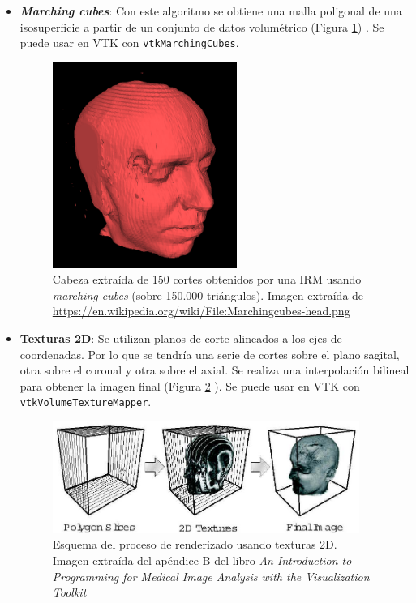 \begin{itemize}
	\item \textbf{\textit{Marching cubes}}: Con este algoritmo se obtiene una malla poligonal de una isosuperficie a partir de un conjunto de datos volumétrico (Figura \ref{fig:marching_cubes_head}) \cite{marching_cubes}. Se puede usar en VTK con \texttt{vtkMarchingCubes}.
	\begin{figure}[H]
		\centering
		\includegraphics[width=6cm]{imagenes/marching_cubes_head}
		\caption{Cabeza extraída de 150 cortes obtenidos por una IRM usando \textit{marching cubes} (sobre 150.000 triángulos). Imagen extraída de \url{https://en.wikipedia.org/wiki/File:Marchingcubes-head.png}}
		\label{fig:marching_cubes_head}
	\end{figure}
	
	\item \textbf{Texturas 2D}: Se utilizan planos de corte alineados a los ejes de coordenadas. Por lo que se tendría una serie de cortes sobre el plano sagital, otra sobre el coronal y otra sobre el axial. Se realiza una interpolación bilineal para obtener la imagen final (Figura \ref{fig:texturas2d} \cite{intro_medical_vtk_bioimage}). Se puede usar en VTK con \texttt{vtkVolumeTextureMapper}.
	\begin{figure}[H]
		\centering
		\includegraphics[width=10cm]{imagenes/texturas2d}
		\caption{Esquema del proceso de renderizado usando texturas 2D. Imagen extraída del apéndice B del libro \textit{An Introduction to Programming for Medical Image Analysis with the Visualization Toolkit} \cite{intro_medical_vtk_bioimage}}
		\label{fig:texturas2d}
	\end{figure}
	

\end{itemize}
